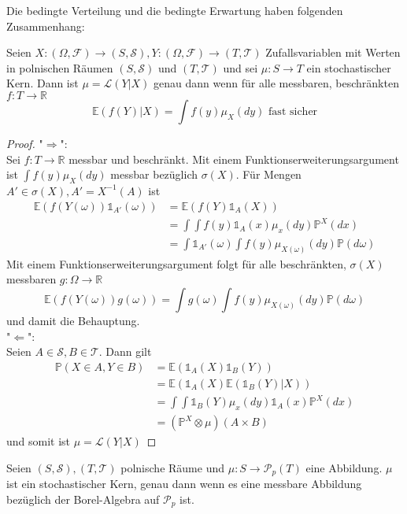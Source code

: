Die bedingte Verteilung und die bedingte Erwartung haben folgenden Zusammenhang:
\begin{lemma}\label{thm:law_expectancy_connection}
Seien $X: (\Omega, \mathcal{F})\rightarrow (S, \mathcal{S}), Y: (\Omega, \mathcal{F})\rightarrow(T, \mathcal{T})$ Zufallsvariablen mit Werten in polnischen Räumen $(S, \mathcal{S})$ und $(T, \mathcal{T})$ und sei $\mu: S\rightarrow T$ ein stochastischer Kern. Dann ist $\mu = \mathcal{L}(Y\vert X)$ genau dann wenn für alle messbaren, beschränkten $f: T\rightarrow \mathbb{R}$
$$\mathbb{E}(f(Y) \vert X) = \int f(y)\mu_X(dy) \text{ fast sicher}$$
\end{lemma}
\begin{proof}
    "$\Rightarrow$": \\
    Sei $f:T\rightarrow \mathbb{R}$ messbar und beschränkt. Mit einem Funktionserweiterungsargument ist $\int f(y)\mu_X(dy)$ messbar bezüglich $\sigma(X)$. Für Mengen $A' \in \sigma(X), A'=X^{-1}(A)$ ist 
    \begin{align*}
    \mathbb{E}(f(Y(\omega))\mathds{1}_{A'}(\omega)) &= \mathbb{E}(f(Y)\mathds{1}_A(X))\\
    &=\int \int f(y) \mathds{1}_A(x)\mu_x(dy)\mathbb{P}^X(dx) \\
    &= \int \mathds{1}_{A'}(\omega) \int f(y)\mu_{X(\omega)}(dy) \mathbb{P}(d\omega)
    \end{align*}
    Mit einem Funktionserweiterungsargument folgt für alle beschränkten, $\sigma(X)$ messbaren $g: \Omega\rightarrow \mathbb{R}$
    $$\mathbb{E}(f(Y(\omega))g(\omega)) = \int g(\omega)\int f(y)\mu_{X(\omega)}(dy)\mathbb{P}(d\omega)$$
    und damit die Behauptung. \\
    "$\Leftarrow$": \\
    Seien $A \in \mathcal{S}, B\in \mathcal{T}$. Dann gilt
    \begin{align*}
        \mathbb{P}(X\in A, Y\in B) &= \mathbb{E}(\mathds{1}_A(X) \mathds{1}_B(Y)) \\
        &= \mathbb{E}(\mathds{1}_A(X)\mathbb{E}(\mathds{1}_B(Y)\vert X)) \\
        &= \int \int \mathds{1}_B(Y) \mu_x(dy) \mathds{1}_A(x)\mathbb{P}^X(dx) \\
        &= (\mathbb{P}^X \otimes \mu)(A\times B)
    \end{align*}
    und somit ist $\mu=\mathcal{L}(Y\vert X)$
\end{proof}
\begin{lemma}\label{thm:kernel_characterization}
    Seien $(S, \mathcal{S}), (T, \mathcal{T})$ polnische Räume und $\mu: S\rightarrow \mathcal{P}_p(T)$ eine Abbildung. $\mu$ ist ein stochastischer Kern, genau dann wenn es eine messbare Abbildung bezüglich der Borel-Algebra auf $\mathcal{P}_p$ ist.
\end{lemma}
